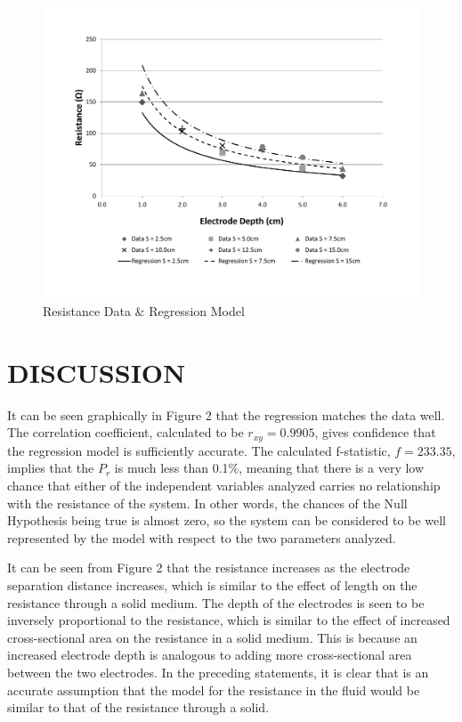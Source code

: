 \documentclass[12pt]{article}
\begin{document}
\begin{figure}[t!] %
   \centering
   \includegraphics[width=\linewidth]{data_and_regression.pdf} 
   \caption{Resistance Data \& Regression Model}
   \label{fig:example}
\end{figure}

\section*{\fontsize{12}{12}\selectfont DISCUSSION}
It can be seen graphically in Figure 2 that the regression matches the data well. The correlation coefficient, calculated to be $r_{xy}=0.9905$, gives confidence that the regression model is sufficiently accurate. The calculated f-statistic, $f=233.35$, implies that the $P_r$ is much less than 0.1\%, meaning that there is a very low chance that either of the independent variables analyzed carries no relationship with the resistance of the system. In other words, the chances of the Null Hypothesis being true is almost zero, so the system can be considered to be well represented by the model with respect to the two parameters analyzed.
\bigskip

It can be seen from Figure 2 that the resistance increases as the electrode separation distance increases, which is similar to the effect of length on the resistance through a solid medium. The depth of the electrodes is seen to be inversely proportional to the resistance, which is similar to the effect of increased cross-sectional area on the resistance in a solid medium. This is because an increased electrode depth is analogous to adding more cross-sectional area between the two electrodes. In the preceding statements, it is clear that is an accurate assumption that the model for the resistance in the fluid would be similar to that of the resistance through a solid.
\end{document}
